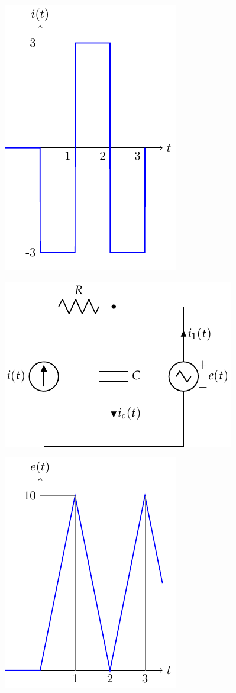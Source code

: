 \documentclass[10pt]{article}
\begin{document}
\begin{minipage}[c]{0.3\linewidth}
  \includegraphics{figs/tren_pulsos.pdf}
\end{minipage}
\begin{minipage}[c]{0.4\linewidth}
  \includegraphics{figs/formas_onda1.pdf}
\end{minipage}
\begin{minipage}[c]{0.3\linewidth}
  \includegraphics{figs/onda_triangular.pdf}
\end{minipage}
\end{document}
